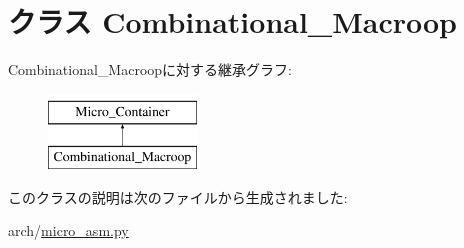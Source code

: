 \hypertarget{classmicro__asm_1_1Combinational__Macroop}{
\section{クラス Combinational\_\-Macroop}
\label{classmicro__asm_1_1Combinational__Macroop}
}
Combinational\_\-Macroopに対する継承グラフ:\begin{figure}[H]
\begin{center}
\leavevmode
\includegraphics[height=2cm]{classmicro__asm_1_1Combinational__Macroop}
\end{center}
\end{figure}


このクラスの説明は次のファイルから生成されました:\begin{DoxyCompactItemize}
\item 
arch/\hyperlink{micro__asm_8py}{micro\_\-asm.py}\end{DoxyCompactItemize}
